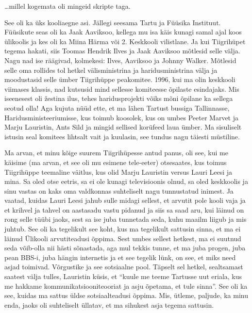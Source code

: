 
\ldots millel kogemata oli mingeid skripte taga. 


See oli ka üks kooliaegne asi. Jällegi seesama Tartu ja Füüsika 
Instituut. Füüsikute seas oli ka Jaak 
Aaviksoo, kellega mu isa käis kunagi samal ajal koos 
ülikoolis ja  kes oli ka Miina Härma või 
2. Keskkooli vilistlane. Ja kui Tiigrihüpet tegema hakati, siis Toomas Hendrik 
Ilves ja Jaak Aaviksoo mõtlesid selle välja. Nagu nad ise räägivad, kolmekesi: Ilves, Aaviksoo 
ja Johnny Walker. Mõtlesid selle oma rollides tol hetkel välisministrina ja 
haridusministrina välja ja moodustasid selle ümber Tiigrihüppe peakomitee. 
1996, kui ma olin keskkooli viimases klassis, nad kutsusid mind sellesse 
komiteesse  õpilaste esindajaks. Mis  iseenesest oli žestina ilus, tehes  
haridusprojekti  võiks mõni õpilane ka sellega seotud olla! Aga kujuta nüüd 
ette, et ma lähen Tartust bussiga Tallinnasse, Haridusministeeriumisse, kus 
toimub koosolek, kus on umbes Peeter Marvet ja Marju 
Lauristin, Ants Sild ja 
mingid sellised korüfeed laua ümber. Ma sisuliselt istusin seal komitees 
lihtsalt vait ja kuulasin, see tundus nagu täiesti müstiline. 

Ma arvan, et minu kõige suurem Tiigrihüpesse antud panus, oli see, kui me käisime (ma 
arvan, et see oli mu esimene tele-eeter) otsesaates, kus toimus Tiigrihüppe 
teemaline väitlus, kus olid Marju Lauristin versus 
Lauri Leesi ja mina. Sa oled otse eetris, sa ei ole  
kunagi televisioonis olnud, sa oled keskkoolis ja sinu vastas on kaks oma 
valdkonnas suhteliselt nagu tunnustatud inimest. Ja vaatad, kuidas Lauri Leesi 
jahub sulle midagi sellest, et arvutit pole kooli vaja ja et krihvel ja tahvel 
on aastasadu vastu pidanud ja siis sa saad aru, kui läinud on rong selle tüübi 
jaoks, sest sa ise juba tunnetada seda,  kuhu maailm liigub ja mis juhtub. See 
oli ka tegelikult see koht, kus ma tegelikult sattusin sinna, et ma ei läinud 
Ülikooli  arvutiteadusi õppima. Sest umbes sellest hetkest, ma ei suutnud seda 
võib-olla nii hästi sõnastada, aga mul tekkis tunne, et ma juba progen, juba 
pean BBS-i, juba hängin internetis ja et see tegelik lünk, on see, et miks need 
asjad toimivad. Võrgustike ja see sotsiaalne pool. Täpselt sel hetkel, 
sealtsamast saatest välja tulles, Lauristin küsis, et \enquote{kuule me teeme 
Tartusse uut eriala, kus me hakkame kommunikatsiooniteooriat ja asju õpetama, 
et tule sinna}. See oli ka see, kuidas ma sattus üldse  sotsiaalteadusi õppima. 
Mis, ütleme, paljude, ka minu enda, jaoks oli suhteliselt üllatav, et ma 
sihukest asja tegema sattusin.

